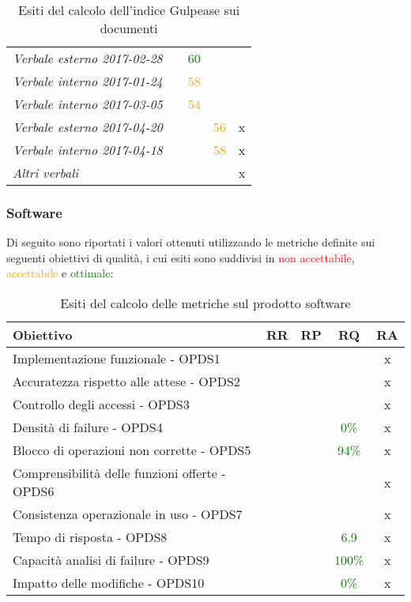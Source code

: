 \documentclass[PdQ.tex]{subfiles}
\begin{document}
\begin{table}[H]
\begin{tabular}{l c c c c}
					\rule[0cm]{0cm}{0.4cm}
					\textit{Verbale esterno 2017-02-28} & & \textcolor{green}{60} & &\\
					\rule[0cm]{0cm}{0.4cm}
					\textit{Verbale interno 2017-01-24} & & \textcolor{orange}{58} & &\\
					\rule[0cm]{0cm}{0.4cm}
					\textit{Verbale interno 2017-03-05} & & \textcolor{orange}{54} & &\\
					\rule[0cm]{0cm}{0.4cm}
					\textit{Verbale esterno 2017-04-20} & & & \textcolor{orange}{56} & x\\
					\rule[0cm]{0cm}{0.4cm}
					\textit{Verbale interno 2017-04-18} & & & \textcolor{orange}{58} & x\\
					\rule[0cm]{0cm}{0.4cm}
					\textit{Altri verbali} & & & & x\\
					\hline
				\end{tabular}
				\caption{Esiti del calcolo dell'indice Gulpease sui documenti}
			\end{table}
	\subsubsection{Software}
	Di seguito sono riportati i valori ottenuti utilizzando le metriche definite sui seguenti obiettivi di qualità, i cui esiti sono suddivisi in \textcolor{red}{non accettabile}, \textcolor{orange}{accettabile} e \textcolor{green}{ottimale}:
	\begin{table}[H]
				\centering
				\begin{tabular}{l c c c c}
					\hline
					\rule[-0.3cm]{0cm}{0.8cm}
					\textbf{Obiettivo} & \textbf{RR} & \textbf{RP} & \textbf{RQ}& \textbf{RA}\\
					\hline
					\rule[0cm]{0cm}{0.4cm}
					Implementazione funzionale - OPDS1 & & & & x \\
					\rule[0cm]{0cm}{0.4cm}
					Accuratezza rispetto alle attese - OPDS2 & & & & x \\
					\rule[0cm]{0cm}{0.4cm}
					Controllo degli accessi - OPDS3 & & & & x \\
					\rule[0cm]{0cm}{0.4cm}
					Densità di failure - OPDS4 & & & \textcolor{green}{0\%} & x \\
					\rule[0cm]{0cm}{0.4cm}
					Blocco di operazioni non corrette - OPDS5 & & & \textcolor{green}{94\%} & x\\
					\rule[0cm]{0cm}{0.4cm}
					Comprensibilità delle funzioni offerte - OPDS6 & & & & x \\
					\rule[0cm]{0cm}{0.4cm}
					Consistenza operazionale in uso - OPDS7 & & & & x \\
					\rule[0cm]{0cm}{0.4cm}
					Tempo di risposta - OPDS8 & & & \textcolor{green}{6.9} & x\\
					\rule[0cm]{0cm}{0.4cm}
					Capacità analisi di failure - OPDS9 & & & \textcolor{green}{100\%} & x\\
					\rule[0cm]{0cm}{0.4cm}
					Impatto delle modifiche - OPDS10 & & & \textcolor{green}{0\%} & x\\
					\hline
				\end{tabular}
				\caption{Esiti del calcolo delle metriche sul prodotto software}
			\end{table}
\end{document}

